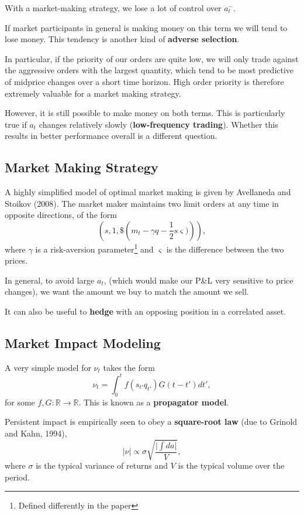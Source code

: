 \documentclass{article}
\begin{document}
With a market-making strategy, we lose a lot of control over $a_t^-$.

If market participants in general is making money on this term we will tend to lose money. This tendency is another kind of \textbf{adverse selection}.

In particular, if the priority of our orders are quite low, we will only trade against the aggressive orders with the largest quantity, which tend to be most predictive of midprice changes over a short time horizon. High order priority is therefore extremely valuable for a market making strategy.

However, it is still possible to make money on both terms. This is particularly true if $a_t$ changes relatively slowly (\textbf{low-frequency trading}). Whether this results in better performance overall is a different question.

\subsection{Market Making Strategy}
A highly simplified model of optimal market making is given by Avellaneda and Stoikov (2008). The market maker maintains two limit orders at any time in opposite directions, of the form
$$\left(s, 1, \$\left(m_t - \gamma q - \frac{1}{2}s\varsigma)\right)\right),$$
where $\gamma$ is a risk-aversion parameter\footnote{Defined differently in the paper} and $\varsigma$ is the difference between the two prices.

In general, to avoid large $a_t$, (which would make our P\&L very sensitive to price changes), we want the amount we buy to match the amount we sell. 

It can also be useful to \textbf{hedge} with an opposing position in a correlated asset.

\subsection{Market Impact Modeling}
A very simple model for $\nu_t$ takes the form
$$\nu_t = \int_0^t f(s_{t'}q_{t'})G(t-t')dt',$$
for some $f,G:\mathbb{R}\to\mathbb{R}$. This is known as a \textbf{propagator model}.

Persistent impact is empirically seen to obey a \textbf{square-root law} (due to Grinold and Kahn, 1994),
$$\vert\nu\vert \propto \sigma\sqrt{\frac{\vert \int da\vert}{V}},$$
where $\sigma$ is the typical variance of returns and $V$ is the typical volume over the period.
\end{document}

